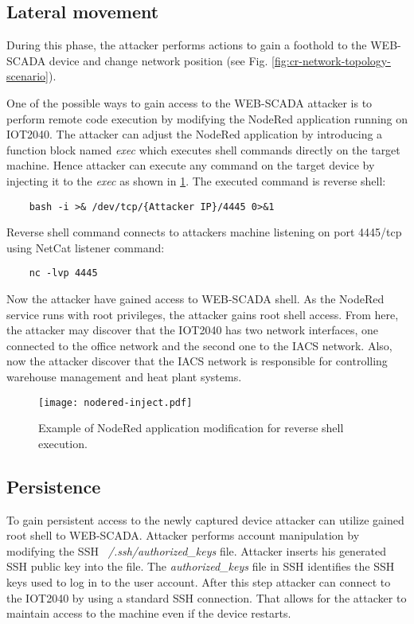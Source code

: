\subsection{Lateral movement}

During this phase, the attacker performs actions to gain a foothold to the WEB-SCADA device and change network position (see Fig. \ref{fig:cr-network-topology-scenario}). 

One of the possible ways to gain access to the WEB-SCADA attacker is to perform remote code execution by modifying the NodeRed application running on IOT2040. The attacker can adjust the NodeRed application by introducing a function block named \textit{exec} which executes shell commands directly on the target machine. Hence attacker can execute any command on the target device by injecting it to the \textit{exec} as shown in \ref{fig:nodered-inject}. The executed command is reverse shell:

\begin{verbatim}
	bash -i >& /dev/tcp/{Attacker IP}/4445 0>&1
\end{verbatim} 

Reverse shell command connects to attackers machine listening on port 4445/tcp using NetCat listener command:

\begin{verbatim}
	nc -lvp 4445
\end{verbatim} 

Now the attacker have gained access to WEB-SCADA shell. As the NodeRed service runs with root privileges, the attacker gains root shell access. From here, the attacker may discover that the IOT2040 has two network interfaces, one connected to the office network and the second one to the IACS network. Also, now the attacker discover that the IACS network is responsible for controlling warehouse management and heat plant systems.

\begin{figure}[htb] %
	\texttt{[image: nodered-inject.pdf]}
	\caption{Example of NodeRed application modification for reverse shell execution.}
	\label{fig:nodered-inject}
\end{figure}


\subsection{Persistence}

To gain persistent access to the newly captured device attacker can utilize gained root shell to WEB-SCADA. Attacker performs account manipulation by modifying the SSH \textit{~/.ssh/authorized\_keys} file. Attacker inserts his generated SSH public key into the file. The \textit{authorized\_keys} file in SSH identifies the SSH keys used to log in to the user account. After this step attacker can connect to the IOT2040 by using a standard SSH connection. That allows for the attacker to maintain access to the machine even if the device restarts.

